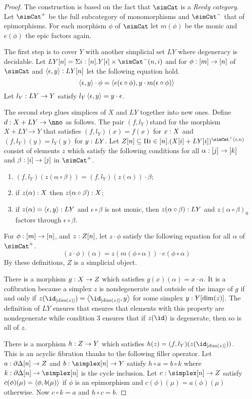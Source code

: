 \documentclass[csh.tex]{subfiles}
\begin{document}
\begin{proof} The construction is based on the fact that $\simCat$ is a \emph{Reedy category}.  Let $\simCat^+$ be the full subcategory of monomorphisms and $\simCat^-$ that of epimorphisms. For each morphism $\phi$ of $\simCat$ let $m(\phi)$ be the monic and $e(\phi)$ the epic factors again.

The first step is to cover $Y$ with another simplicial set $LY$ where degeneracy is decidable.
Let $LY[n] = \Sigma i\of[n]. Y[i]\times\simCat^-(n,i)$ and for $\phi: [m]\to [n]$ of $\simCat$ and $\left\langle \epsilon,y \right\rangle: LY[n]$ let the following equation hold.
\[\left\langle \epsilon,y \right\rangle\cdot \phi=\left\langle e(\epsilon\circ \phi),y\cdot m(\epsilon\circ\phi) \right\rangle\]
Let $l_Y: LY\to Y$ satisfy $l_Y\left\langle \epsilon,y \right\rangle=y\cdot\epsilon$.

The second step glues simplices of $X$ and $LY$ together into new ones. Define $d\of X+LY\to\nno$ as follows. %
The pair $(f,l_Y)$stand for the morphism $X+LY\to Y$ that satisfies $(f,l_Y)(x)=f(x)$ for $x: X$ and $(f,l_Y)(y) = l_Y(y)$ for $y: LY$. Let $Z[n]\subseteq \Pi i\in[n].(X[i]+LY[i])^{\simCat^+(i,n)}$ consist of elements $z$ which satisfy the following conditions for all $\alpha: [j]\to [k]$ and $\beta: [i]\to[j]$ in $\simCat^+$.
\begin{enumerate}
\item $(f,l_Y)(z(\alpha\circ\beta)) = (f,l_Y)(z(\alpha))\cdot\beta$;
\item if $z(\alpha): X$ then $z(\alpha\circ\beta): X$;
\item if $z(\alpha)=\left\langle \epsilon,y \right\rangle: LY$ and $\epsilon\circ\beta$ is not monic, then $z(\alpha\circ\beta): LY$ and $z(\alpha\circ\beta)_0$ factors through $\epsilon\circ\beta$.
\end{enumerate}
For $\phi:[m]\to [n]$, and $z: Z[n]$, let $z\cdot\phi$ satisfy the following equation for all $\alpha$ of $\simCat^+$.
\[ (z\cdot\phi)(\alpha) = z(m(\phi\circ\alpha))\cdot e(\phi\circ \alpha) \]
By these definitions, $Z$ is a simplicial object.

There is a morphism $g: X\to Z$ which satisfies $g(x)(\alpha) = x\cdot\alpha$. It is a cofibration because a simplex $z$ is nondegenerate and outside of the image of $g$ if and only if $z(\id_{[\dim(z)]}) = \tuplet{\id_{[\dim(z)]},y}$ for some simplex $y: Y[\dim(z)]$. The definition of $LY$ ensures that ensures that elements with this property are nondegenerate while condition 3 ensures that if $z(\id)$ is degenerate, then so is all of $z$.

There is a morphism $h: Z\to Y$ which satisfies $h(z) = (f,l_Y)(z(\id_{[\dim(z)]}))$. This is an acyclic fibration thanks to the following filler operator. Let $a: \partial\Delta[n]\to Z$ and $b\of \simplex[n]\to Y$ satisfy $h\circ a = b\circ k$ where $k\of\cycle[n]\to\simplex[n]$ is the cycle inclusion. Let $c\of \simplex[n]\to Z$ satisfy $c(\phi)(\mu) = \left\langle \phi,b(\mu) \right\rangle$ if $\phi$ is an epimorphism and $c(\phi)(\mu) = a(\phi)(\mu)$ otherwise. Now $c\circ k = a$ and $h\circ c = b$.
\end{proof}
\end{document}
